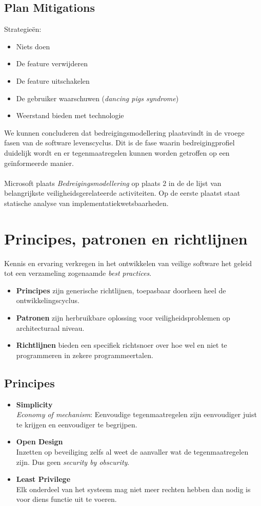 \documentclass[../main.tex]{subfiles}
\begin{document}
\subsection{Plan Mitigations}
Strategie\"en:
\begin{itemize}
	\item Niets doen
	\item De feature verwijderen
	\item De feature uitschakelen
	\item De gebruiker waarschuwen (\textit{dancing pigs syndrome})
	\item Weerstand bieden met technologie
\end{itemize} 

We kunnen concluderen dat bedreigingsmodellering  plaatsvindt in de vroege fasen van de software levenscyclus. Dit is de fase waarin bedreigingprofiel duidelijk wordt en er tegenmaatregelen kunnen worden getroffen op een ge\"informeerde manier. 
\\\\
Microsoft plaats \textit{Bedreigingsmodellering} op plaats 2 in de de lijst van belangrijkste veiligheidsgerelateerde activiteiten. Op de eerste plaatst staat statische analyse van implementatiekwetsbaarheden.

\section{Principes, patronen en richtlijnen}
Kennis en ervaring verkregen in het ontwikkelen van veilige software het geleid tot een verzameling zogenaamde \textit{best practices}. 
\begin{itemize}
	\item \textbf{Principes} zijn generische richtlijnen, toepasbaar doorheen heel de ontwikkelingscyclus.
	\item \textbf{Patronen} zijn herbruikbare oplossing voor veiligheidsproblemen op architecturaal niveau.
	\item \textbf{Richtlijnen} bieden een specifiek richtsnoer over hoe wel en niet te programmeren in zekere programmeertalen. 
\end{itemize}

\subsection{Principes}
\begin{itemize}
	\item \textbf{Simplicity} \\ 
	\textit{Economy of mechanism}: Eenvoudige tegenmaatregelen zijn eenvoudiger juist te krijgen en eenvoudiger te begrijpen.
	\item \textbf{Open Design} \\
	Inzetten op beveiliging zelfs al weet de aanvaller wat de tegenmaatregelen zijn. Dus geen  \textit{security by obscurity}.
	\item \textbf{Least Privilege} \\ 
	Elk onderdeel van het systeem mag niet meer rechten hebben dan nodig is voor diens functie uit te voeren.
\end{itemize}
\end{document}

